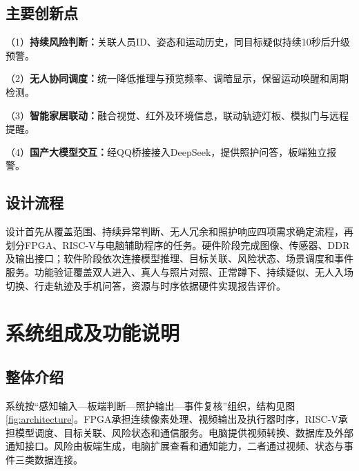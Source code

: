 \documentclass[UTF8,a4paper,zihao=-4,fontset=none,scheme=plain]{ctexart}
\begin{document}
\subsection{主要创新点}
（1）\textbf{持续风险判断：}关联人员ID、姿态和运动历史，同目标疑似持续10秒后升级预警。

（2）\textbf{无人协同调度：}统一降低推理与预览频率、调暗显示，保留运动唤醒和周期检测。

（3）\textbf{智能家居联动：}融合视觉、红外及环境信息，联动轨迹灯板、模拟门与远程提醒。

（4）\textbf{国产大模型交互：}经QQ桥接接入DeepSeek，提供照护问答，板端独立报警。

\subsection{设计流程}
设计首先从覆盖范围、持续异常判断、无人冗余和照护响应四项需求确定流程，再划分FPGA、RISC-V与电脑辅助程序的任务。硬件阶段完成图像、传感器、DDR及输出接口；软件阶段依次连接模型推理、目标关联、风险状态、场景调度和事件服务。功能验证覆盖双人进入、真人与照片对照、正常蹲下、持续疑似、无人入场切换、行走轨迹及手机问答，资源与时序依据硬件实现报告评价。

\FloatBarrier
\clearpage
\section{系统组成及功能说明}
\subsection{整体介绍}
系统按“感知输入—板端判断—照护输出—事件复核”组织，结构见图\ref{fig:architecture}。FPGA承担连续像素处理、视频输出及执行器时序，RISC-V承担模型调度、目标关联、风险状态和通信服务\cite{project}。电脑提供视频转换、数据库及外部通知接口。风险由板端生成，电脑扩展查看和通知能力，二者通过视频、状态与事件三类数据连接。
\end{document}
